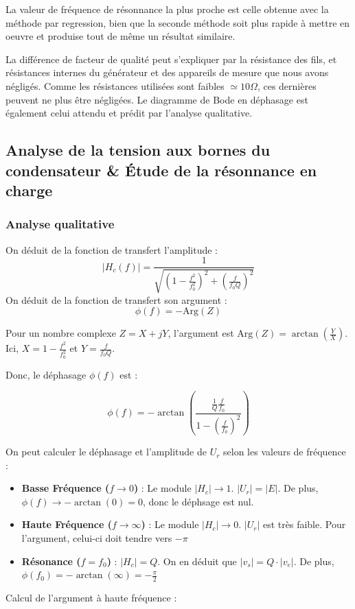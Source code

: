 \documentclass[a4paper,9pt,french]{scrartcl}
\begin{document}
La valeur de fréquence de résonnance la plus proche est celle obtenue avec la méthode par regression, bien que la seconde méthode soit plus rapide à mettre en oeuvre et produise tout de m\^eme un résultat similaire. %

La différence de facteur de qualité peut s'expliquer par la résistance des fils, et résistances internes du générateur et des appareils de mesure que nous avons négligés. Comme les résistances utilisées sont faibles \(\simeq 10 \Omega\), ces dernières peuvent ne plus \^etre négligées.
Le diagramme de Bode en déphasage est également celui attendu et prédit par l'analyse qualitative.
\subsection{Analyse de la tension aux bornes du condensateur \& Étude de la résonnance en charge}
\subsubsection{Analyse qualitative}
On déduit de la fonction de transfert l'amplitude :
\begin{equation}
 |H_c(f)| = \frac{1}{\sqrt{\left(1 - \frac{f^2}{f_0^2}\right)^2 + \left(\frac{f}{f_0 Q}\right)^2}}
\end{equation}
On déduit de la fonction de transfert son argument :
$$\phi(f) = - \text{Arg}(Z)$$

Pour un nombre complexe $Z = X + jY$, l'argument est $\text{Arg}(Z) = \arctan\left(\frac{Y}{X}\right)$.
Ici, $X = 1 - \frac{f^2}{f_0^2}$ et $Y = \frac{f}{f_0 Q}$.

Donc, le déphasage $\phi(f)$  est :

$$\phi(f) = - \arctan\left(\frac{\frac{1}{Q} \frac{f}{f_0}}{1 - \left(\frac{f}{f_0}\right)^2}\right)$$

On peut calculer le déphasage et l'amplitude de \(U_r\) selon les valeurs de fréquence :
\begin{itemize}
    \item \textbf{Basse Fréquence ($f \to 0$)} :  Le module $|H_c| \to 1$. $|U_r| = |E|$. De plus, \(\phi(f) \to - \arctan(0) = 0\), donc le déphsage est nul.
    \item \textbf{Haute Fréquence ($f \to \infty$)} : Le module $|H_c| \to 0$. $|U_r|$ est très faible. Pour l'argument, celui-ci doit tendre vers \(-\pi\)
    \item \textbf{Résonance ($f = f_0$)} : $|H_c| = Q$. On en déduit que $|v_s| = Q \cdot |v_e|$. De plus, $\phi(f_0) = - \arctan(\infty) = -\frac{\pi}{2}$
\end{itemize}
Calcul de l'argument à haute fréquence :
\end{document}
